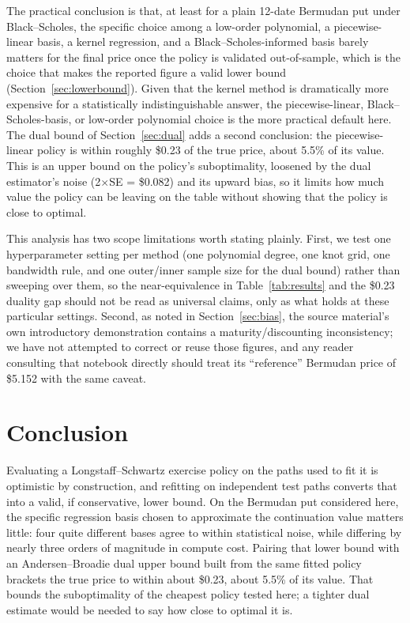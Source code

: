 \documentclass[11pt]{article}
\begin{document}
The practical conclusion is that, at least for a plain 12-date Bermudan put under Black--Scholes, the specific choice among a low-order polynomial, a piecewise-linear basis, a kernel regression, and a Black--Scholes-informed basis barely matters for the final price once the policy is validated out-of-sample, which is the choice that makes the reported figure a valid lower bound (Section~\ref{sec:lowerbound}). Given that the kernel method is dramatically more expensive for a statistically indistinguishable answer, the piecewise-linear, Black--Scholes-basis, or low-order polynomial choice is the more practical default here. The dual bound of Section~\ref{sec:dual} adds a second conclusion: the piecewise-linear policy is within roughly \$0.23 of the true price, about 5.5\% of its value. This is an upper bound on the policy's suboptimality, loosened by the dual estimator's noise (2$\times$SE = \$0.082) and its upward bias, so it limits how much value the policy can be leaving on the table without showing that the policy is close to optimal.

This analysis has two scope limitations worth stating plainly. First, we test one hyperparameter setting per method (one polynomial degree, one knot grid, one bandwidth rule, and one outer/inner sample size for the dual bound) rather than sweeping over them, so the near-equivalence in Table~\ref{tab:results} and the \$0.23 duality gap should not be read as universal claims, only as what holds at these particular settings. Second, as noted in Section~\ref{sec:bias}, the source material's own introductory demonstration contains a maturity/discounting inconsistency; we have not attempted to correct or reuse those figures, and any reader consulting that notebook directly should treat its ``reference'' Bermudan price of \$5.152 with the same caveat.

\section{Conclusion}

Evaluating a Longstaff--Schwartz exercise policy on the paths used to fit it is optimistic by construction, and refitting on independent test paths converts that into a valid, if conservative, lower bound. On the Bermudan put considered here, the specific regression basis chosen to approximate the continuation value matters little: four quite different bases agree to within statistical noise, while differing by nearly three orders of magnitude in compute cost. Pairing that lower bound with an Andersen--Broadie dual upper bound built from the same fitted policy brackets the true price to within about \$0.23, about 5.5\% of its value. That bounds the suboptimality of the cheapest policy tested here; a tighter dual estimate would be needed to say how close to optimal it is.
\end{document}

